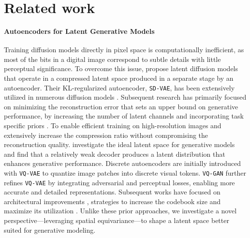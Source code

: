 \section{Related work}
\label{sec:related}


\paragraph{Autoencoders for Latent Generative Models}
Training diffusion models directly in pixel space is computationally inefficient, as most of the bits in a digital image correspond to subtle details with little perceptual significance. To overcome this issue, \citet{rombach2022high} propose latent diffusion models that operate in a compressed latent space produced in a separate stage by an autoencoder. Their KL-regularized autoencoder, \texttt{SD-VAE}, has been extensively utilized in numerous diffusion models \cite{yao2024fasterdit, ma2024sit, chen2024pixartalpha}. Subsequent research has primarily focused on minimizing the reconstruction error that sets an upper bound on generative performance,
by increasing the number of latent channels \cite{esser2024sd3, flux2023, dai2023emu} and incorporating task specific priors \cite{zhu2023designing}.
To enable efficient training on high-resolution images \citet{xie2025sana} and \citet{chen2025deep}  extensively increase the compression ratio without compromising the reconstruction quality.
\citet{hu2023complexity} investigate the ideal latent space for generative models and find that a relatively weak decoder produces a latent distribution that enhances generative performance. 
Discrete autoencoders are initially introduced with \texttt{VQ-VAE} \cite{oord2017vq} to quantize image patches into discrete visual tokens. \texttt{VQ-GAN} \cite{esser2021taming} further refines \texttt{VQ-VAE} by integrating adversarial and perceptual losses,
enabling more accurate and detailed representations. Subsequent works have focused on architectural improvements \cite{yu2022vectorquantized}, strategies to increase the codebook size and maximize its utilization \cite{yu2024language, zhu2024scaling}.
Unlike these prior approaches, we investigate a novel perspective—leveraging spatial equivariance—to shape a latent space better suited for generative modeling.



